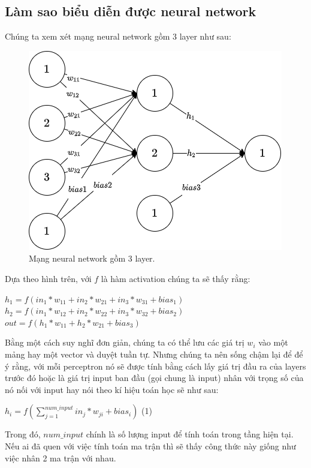 \subsection{Làm sao biểu diễn được neural network}
Chúng ta xem xét mạng neural network gồm 3 layer như sau:
\begin{figure}[!h]
	\centering
		\includegraphics[width=0.5\columnwidth]{books/artificial-neural-network/chapter03/figure/weight(1).png}
        \caption{Mạng neural network gồm 3 layer.}
        \label{fig:weight}
		\centering
\end{figure}

Dựa theo hình trên, với $f$ là hàm activation chúng ta sẽ thấy rằng:
\begin{center}
$h_{1} = f(in_{1}*w_{11}+in_{2}*w_{21}+in_{3}*w_{31}+bias_{1})$\\
$h_{2} = f(in_{1}*w_{12}+in_{2}*w_{22}+in_{3}*w_{32}+bias_{2})$\\
$out = f(h_{1}*w_{11}+h_{2}*w_{21}+bias_{3})$\\
\end{center}

Bằng một cách suy nghĩ đơn giản, chúng ta có thể lưu các giá trị $w_{i}$ vào một mảng hay một vector và duyệt tuần tự. Nhưng chúng ta nên sống chậm lại để để ý rằng, với mỗi perceptron nó sẽ được tính bằng cách lấy giá trị đầu ra của layers trước đó hoặc là giá trị input ban đầu (gọi chung là input) nhân với trọng số của nó nối với input hay nói theo kí hiệu toán học sẽ như sau:
\begin{center}
    $h_{i} = f(\sum_{j=1}^{num\_input} in_{j}*w_{ji}+bias_{i})$ (1)
\end{center}

Trong đó, $num\_input$ chính là số lượng input để tính toán trong tầng hiện tại. Nếu ai đã quen với việc tính toán ma trận thì sẽ thấy công thức này giống như việc nhân 2 ma trận với nhau.

